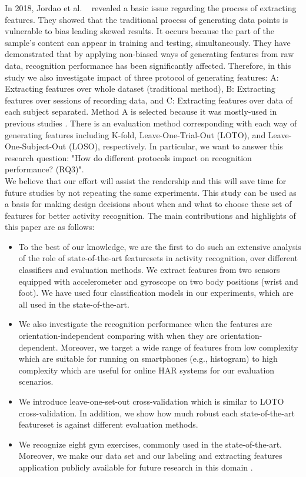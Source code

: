 \documentclass[journal,article,submit,moreauthors,pdftex]{Definitions/mdpi}
\begin{document}
In 2018, Jordao et al. ~\cite{jordao2018human} revealed a basic issue regarding the process of extracting features. They showed that the traditional process of generating data points is vulnerable to bias leading skewed results. It occurs because the part of the sample's content can appear in training and testing, simultaneously. They have demonstrated that by applying non-biased ways of generating features from raw data, recognition performance has been significantly affected. Therefore, in this study we also investigate impact of three protocol of generating features: A: Extracting features over whole dataset (traditional method), B: Extracting features over sessions of recording data, and C: Extracting features over data of each subject separated. Method A is selected because it was mostly-used in previous studies \cite{}. There is an evaluation method corresponding with each way of generating features including K-fold, Leave-One-Trial-Out (LOTO), and Leave-One-Subject-Out (LOSO), respectively. In particular, we want to answer this research question: "How do different protocols impact on recognition performance? (RQ3)".\\

We believe that our effort will assist the readership and this will save time for future studies by not repeating the same experiments. This study can be used as a basis for making design decisions about when and what to choose these set of features for better activity recognition. The main contributions and highlights of this paper are as follows:

\begin{itemize}
	\item To the best of our knowledge, we are the first to do such an extensive analysis of the role of state-of-the-art featuresets in activity recognition, over different classifiers and evaluation methods. We extract features from two sensors equipped with accelerometer and gyroscope on two body positions (wrist and foot). We have used four classification models in our experiments, which are all used in the state-of-the-art. 
	\item We also investigate the recognition performance when the features are orientation-independent comparing with when they are orientation-dependent. Moreover, we target a wide range of features from low complexity which are suitable for running on smartphones (e.g., histogram) to high complexity which are useful for online HAR systems\cite{morris2014recofit} for our evaluation scenarios.
	\item We introduce leave-one-set-out cross-validation which is similar to LOTO cross-validation. In addition, we show how much robust each state-of-the-art featureset is against different evaluation methods.
	\item We recognize eight gym exercises, commonly used in the state-of-the-art. Moreover, we make our data set and our labeling and extracting features application publicly available for future research in this domain \cite{gymDataset}.
\end{itemize}
\end{document}
